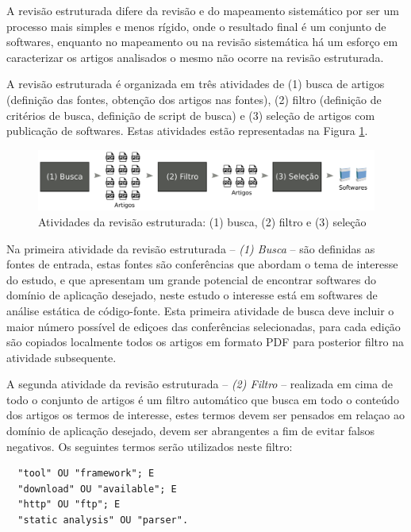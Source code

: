 A revisão estruturada difere da revisão e do mapeamento sistemático por ser um
processo mais simples e menos rígido, onde o resultado final é um conjunto de
softwares, enquanto no mapeamento ou na revisão sistemática há um esforço em
caracterizar os artigos analisados o mesmo não ocorre na revisão estruturada.

A revisão estruturada é organizada em três atividades de (1) busca de artigos
(definição das fontes, obtenção dos artigos nas fontes), (2) filtro (definição
de critérios de busca, definição de script de busca) e (3) seleção de artigos
com publicação de softwares. Estas atividades estão representadas na Figura
\ref{figura-revisao-estruturada}.

\begin{figure}[h]
  \center
  \includegraphics[scale=0.21]{imagens/revisao-estruturada.png}
  \caption{Atividades da revisão estruturada: (1) busca, (2) filtro e (3) seleção}
  \label{figura-revisao-estruturada}
\end{figure}

Na primeira atividade da revisão estruturada -- {\it (1) Busca} -- são definidas as fontes de entrada,
estas fontes são conferências que abordam o tema de interesse do estudo, e que
apresentam um grande potencial de encontrar softwares do domínio de aplicação
desejado, neste estudo o interesse está em softwares de análise estática de
código-fonte. Esta primeira atividade de busca deve incluir o maior número
possível de ediçoes das conferências selecionadas, para cada edição são
copiados localmente todos os artigos em formato PDF para posterior filtro na
atividade subsequente.

A segunda atividade da revisão estruturada -- {\it (2) Filtro} -- realizada em cima de todo o conjunto
de artigos é um filtro automático que busca em todo o conteúdo dos artigos os
termos de interesse, estes termos devem ser pensados em relaçao ao domínio de
aplicação desejado, devem ser abrangentes a fim de evitar falsos negativos.
Os seguintes termos serão utilizados neste filtro:

\begin{verbatim}
  "tool" OU "framework"; E
  "download" OU "available"; E
  "http" OU "ftp"; E
  "static analysis" OU "parser".
\end{verbatim}

